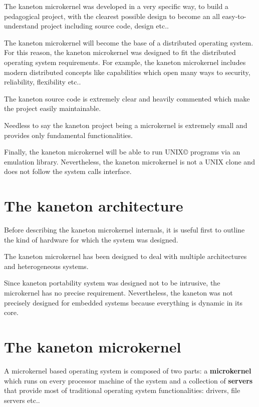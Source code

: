 \begin{multicols}{2}
The kaneton microkernel was developed in a very specific way, to build
a pedagogical project, with the clearest possible design to become an
all easy-to-understand project including source code, design etc..

The kaneton microkernel will become the base of a distributed operating
system. For this reason, the kaneton microkernel was designed to fit
the distributed operating system requirements. For example, the kaneton
microkernel includes modern distributed concepts like capabilities
which open many ways to security, reliability, flexibility etc..

The kaneton source code is extremely clear and heavily commented which
make the project easily maintainable.

Needless to say the kaneton project being a microkernel is extremely small
and provides only fundamental functionalities.

Finally, the kaneton microkernel will be able to run
UNIX{\scriptsize \copyright} programs via an emulation library.
Nevertheless, the kaneton microkernel is not a UNIX clone and does not
follow the system calls interface.

%
%

\section{The kaneton architecture}

Before describing the kaneton microkernel internals, it is useful first to
outline the kind of hardware for which the system was designed.

The kaneton microkernel has been designed to deal with multiple architectures
and heterogeneous systems.

Since kaneton portability system was designed not to be intrusive, the
microkernel has no precise requirement. Nevertheless, the kaneton was not
precisely designed for embedded systems because everything is dynamic in
its core.

%
%

\section{The kaneton microkernel}

A microkernel based operating system is composed of two parts:
a \textbf{microkernel} which runs on every processor machine of the system
and a collection of \textbf{servers} that provide most of traditional
operating system functionalities: drivers, file servers etc..


\end{multicols}
